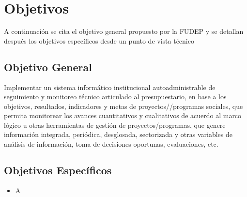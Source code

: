 \section{Objetivos}

A continuación se cita el objetivo general propuesto por la FUDEP y se detallan después los objetivos específicos desde un punto de vista técnico

\subsection{Objetivo General}

Implementar un sistema informático institucional autoadministrable de seguimiento y monitoreo técnico articulado al presupuestario, en base a los objetivos, resultados, indicadores y metas de proyectos//programas sociales, que permita monitorear los avances cuantitativos y cualitativos de acuerdo al marco lógico u otras herramientas de gestión de proyectos/programas, que genere información integrada, periódica, desglosada, sectorizada y otras variables de análisis de información, toma de decisiones oportunas, evaluaciones, etc.

\subsection{Objetivos Específicos}

\begin{itemize}
    \item A
\end{itemize}